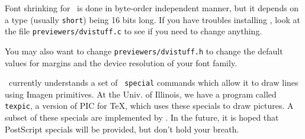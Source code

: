 Font shrinking for \texx\ is done in byte-order independent manner,
but it depends on a type (usually {\tt short}) being 16 bits long.
If you have troubles installing \texx, look at the file
{\tt previewers/dvistuff.c} to see if you need to change anything.

You may also want to change {\tt previewers/dvistuff.h} to change
the default values for margins and the device resolution of your
font family.

\iptex\ currently understands a set of \dvi\ {\tt special} commands
which allow it to draw lines using Imagen primitives.
At the Univ. of Illinois, we have a program called {\tt texpic},
a version of PIC for \TeX, which uses these specials to draw pictures.
A subset of these specials are implemented by \texx.
In the future, it is hoped that PostScript specials will be provided,
but don't hold your breath.

